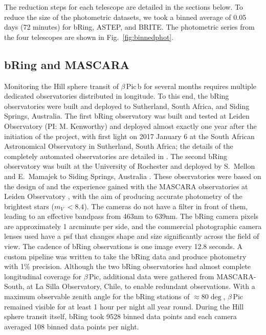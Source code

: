 \documentclass[longauth]{aa} %
\newcommand{\bpb}{$\beta$\,Pic\,b}
\newcommand{\bp}{$\beta$\,Pic}
\begin{document}
The reduction steps for each telescope are detailed in the sections below.
%
To reduce the size of the photometric datasets, we took a binned average of 0.05 days (72 minutes) for bRing, ASTEP, and BRITE.
%
The photometric series from the four telescopes are shown in Fig.~\ref{fig:binnedphot}.

\subsection{bRing and MASCARA}

Monitoring the Hill sphere transit of \bpb{} for several months requires multiple dedicated observatories distributed in longitude.
%
To this end, the bRing observatories \citep{Stuik17} were built and deployed to Sutherland, South Africa, and Siding Springs, Australia.
%
The first bRing observatory was built and tested at Leiden Observatory (PI: M. Kenworthy) and deployed almost exactly one year after the initiation of the project, with first light on 2017 January 6 at the South African Astronomical Observatory in Sutherland, South Africa; the details of the completely automated observatories are detailed in \citet{Stuik17}.
%
The second bRing observatory was built at the University of Rochester and deployed by S.~Mellon and E.~Mamajek to Siding Springs, Australia \citep{Mellon20Thesis}.
%
These observatories were based on the design of and the experience gained with the MASCARA observatories at Leiden Observatory  \citep{talens2017}, with the aim of producing accurate photometry of the brightest stars ($m_V\ < 8.4$).
%
The cameras do not have a filter in front of them, leading to an effective bandpass from 463nm to 639nm.
%
The bRing camera pixels are approximately 1 arcminute per side, and the commercial photographic camera lenses used have a \ac{psf} that changes shape and size significantly across the field of view.
%
The cadence of bRing observations is one image every 12.8 seconds.
%
A custom pipeline \citep{talens2018} was written to take the bRing data and produce photometry with 1\% precision.
%
Although the two bRing observatories had almost complete longitudinal coverage for \bp{}, additional data were gathered from MASCARA-South, at La Silla Observatory, Chile, to enable redundant observations.
%
With a maximum observable zenith angle for the bRing stations of $\approx 80\deg$, \bp{} remained visible for at least 1 hour per night all year round.
%
During the Hill sphere transit itself, bRing took 9528 binned data points and each camera averaged 108 binned data points per night.
\end{document}

